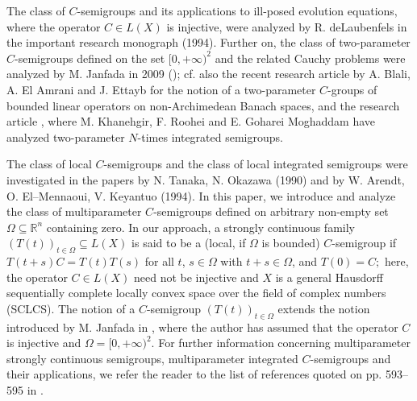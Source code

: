 \documentclass{amsart}
\theoremstyle{definition}
\theoremstyle{remark}
\numberwithin{equation}{section}
\begin{document}
The class of $C$-semigroups and its applications to ill-posed evolution equations, where the operator $C\in L(X)$ is injective, were analyzed by R. deLaubenfels in the important research monograph \cite{l1} (1994).
Further on, the class of two-parameter $C$-semigroups defined on the set $[0,+\infty)^{2}$ and the related Cauchy problems were analyzed by M. Janfada in 2009 (\cite{janfada}); cf. also the recent research article \cite{blali} by A. Blali, A. El Amrani and J. Ettayb for the notion of a
two-parameter $C$-groups of bounded linear operators
on non-Archimedean Banach spaces, and the research article \cite{Khanehgir}, where
M. Khanehgir, F. Roohei and E. Goharei Moghaddam have analyzed two-parameter $N$-times integrated semigroups. 

The class of local $C$-semigroups and the class of local integrated semigroups were investigated in the papers \cite{tanaka} by N. Tanaka, N. Okazawa (1990) and \cite{a42} by W. Arendt, O. El--Mennaoui, V. Keyantuo (1994).
In this paper, we introduce and analyze the class of multiparameter $C$-semigroups defined on arbitrary non-empty set $\Omega \subseteq {\mathbb R}^{n}$ containing zero. In our approach, a strongly continuous family $(T(t))_{t\in \Omega}\subseteq L(X)$ 
is said to be a (local, if $\Omega$ is bounded) $C$-semigroup if $T(t+s)C=T(t)T(s)$ for all $t$, $s\in \Omega$ with $t+s \in \Omega$,
and $T(0)=C;$ here, the operator $C\in L(X)$ need not be injective and $X$ is a general Hausdorff sequentially complete locally convex space over the field of complex numbers (SCLCS). The notion of a $C$-semigroup $(T(t))_{t\in \Omega}$ extends the notion introduced by M. Janfada in \cite[Definition 2.1]{janfada}, where the author has assumed that the operator $C$ is injective and $\Omega=[0,+\infty)^{2}.$  For further information concerning multiparameter strongly continuous semigroups, multiparameter integrated $C$-semigroups and their applications, we refer the reader to the list of references quoted on pp. 593--595 in \cite{nova-selected}.  
\end{document}
